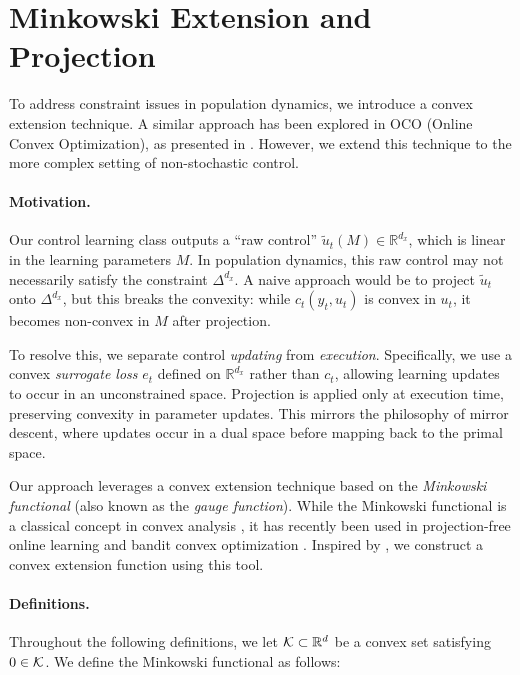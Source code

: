 \section{Minkowski Extension and Projection}\label{sec:min}

To address constraint issues in population dynamics, we introduce a convex extension technique. A similar approach has been explored in OCO (Online Convex Optimization), as presented in \citep[Section~4]{cutkosky2018black}. However, we extend this technique to the more complex setting of non-stochastic control.

\paragraph{Motivation.} Our control learning class outputs a ``raw control'' $\tilde{u}_t(M) \in \mathbb{R}^{d_x}$, which is linear in the learning parameters $M$. In population dynamics, this raw control may not necessarily satisfy the constraint $\Delta^{d_x}$. A naive approach would be to project $\tilde{u}_t$ onto $\Delta^{d_x}$, but this breaks the convexity: while $c_t(y_t, u_t)$ is convex in $u_t$, it becomes non-convex in $M$ after projection.

To resolve this, we separate control \emph{updating} from \emph{execution}. Specifically, we use a convex \emph{surrogate loss} $e_t$ defined on $\mathbb{R}^{d_x}$ rather than $c_t$, allowing learning updates to occur in an unconstrained space. Projection is applied only at execution time, preserving convexity in parameter updates. This mirrors the philosophy of mirror descent, where updates occur in a dual space before mapping back to the primal space.

Our approach leverages a convex extension technique based on the \emph{Minkowski functional} (also known as the \emph{gauge function}). While the Minkowski functional is a classical concept in convex analysis \citep{rockafellar1970convex}, it has recently been used in projection-free online learning \citep{mhammedi2022efficient} and bandit convex optimization \citep{fokkema2024online}. Inspired by \cite{lattimore2024bandit}, we construct a convex extension function using this tool.

\paragraph{Definitions.} Throughout the following definitions, we let $\mathcal{K}\subset\mathbb{R}^d$ be a convex set satisfying $0\in\mathcal{K}$. We define the Minkowski functional as follows:


